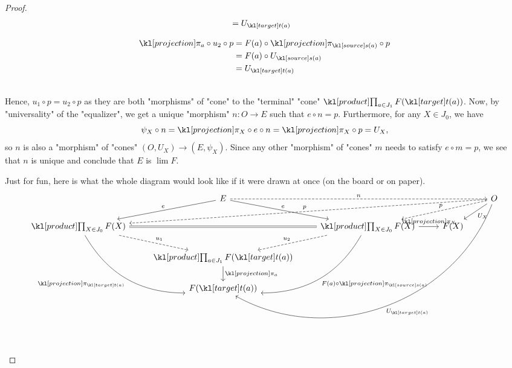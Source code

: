 \documentclass[main.tex]{subfiles}
\begin{document}
\begin{proof}
\begin{minipage}{0.49\textwidth}
\begin{align*}
        &= U_{\target(a)}
    \end{align*}
    \end{minipage}
    \begin{minipage}{0.49\textwidth}
    \begin{align*}
        \projection_a \circ u_2 \circ p &= F(a) \circ \projection_{\source(a)} \circ p\\
        &= F(a) \circ U_{\source(a)}\\
        &= U_{\target(a)}
    \end{align*}
    \end{minipage}\vspace{1em}
    \\ 
    Hence, $u_1 \circ p = u_2 \circ p$ as they are both "morphisms" of "cone" to the "terminal" "cone" $\Product_{a \in J_1} F(\target(a))$. Now, by "universality" of the "equalizer", we get a unique "morphism" $n: O\rightarrow E$ such that $e \circ n = p$. Furthermore, for any $X \in J_0$, we have \[\psi_X \circ n = \projection_X \circ e \circ n = \projection_X \circ p = U_X,\]
    so $n$ is also a "morphism" of "cones" $(O, U_X)\rightarrow (E, \psi_X)$. Since any other "morphism" of "cones" $m$ needs to satisfy $e \circ m = p$, we see that $n$ is unique and conclude that $E$ is $\lim F$.

    Just for fun, here is what the whole diagram would look like if it were drawn at once (on the board or on paper).
    \begin{equation*}
        \begin{tikzcd}
            & E \arrow[ld, "e"'] \arrow[rd, "e"] \arrow[rrr, "n", dashed] &   &   & O \arrow[ld, "U_X"] \arrow[lllddd, "U_{\target(a)}", bend left=49] \arrow[lld, "p"', dashed] \arrow[lllld, "p"', dashed] \\
\Product_{X \in J_0} F(X) \arrow[rdd, "\projection_{\target(a)}"', bend right] \arrow[rd, "u_1", dashed] \arrow[rr, equal] &  & \Product_{X \in J_0} F(X) \arrow[ldd, "F(a) \circ \projection_{\source(a)}", bend left] \arrow[ld, "u_2"', dashed] \arrow[r, "\projection_X"] & F(X) &  \\
            & \Product_{a \in J_1} F(\target(a)) \arrow[d, "\projection_{a}"] &  & &\\
            & F(\target(a))& & &     
\end{tikzcd}
    \end{equation*}
\end{proof}
\end{document}
